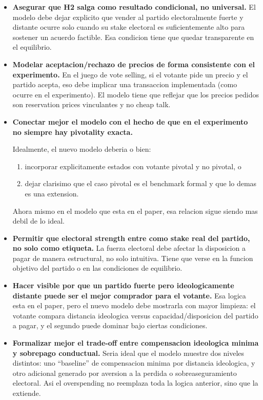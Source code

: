 \documentclass[11pt]{article}
\begin{document}
\begin{itemize}
\item \textbf{Asegurar que H2 salga como resultado condicional, no universal.}  
El modelo debe dejar explicito que vender al partido electoralmente fuerte y distante ocurre solo cuando su stake electoral es suficientemente alto para sostener un acuerdo factible. Esa condicion tiene que quedar transparente en el equilibrio.

\item \textbf{Modelar aceptacion/rechazo de precios de forma consistente con el experimento.}  
En el juego de vote selling, si el votante pide un precio y el partido acepta, eso debe implicar una transaccion implementada (como ocurre en el experimento). El modelo tiene que reflejar que los precios pedidos son reservation prices vinculantes y no cheap talk.

\item \textbf{Conectar mejor el modelo con el hecho de que en el experimento no siempre hay pivotality exacta.}  

Idealmente, el nuevo modelo deberia o bien:
\begin{enumerate}
\item incorporar explicitamente estados con votante pivotal y no pivotal, o
\item dejar clarisimo que el caso pivotal es el benchmark formal y que lo demas es una extension.
\end{enumerate}

Ahora mismo en el modelo que esta en el paper, esa relacion sigue siendo mas debil de lo ideal.

\item \textbf{Permitir que electoral strength entre como stake real del partido, no solo como etiqueta.}  
La fuerza electoral debe afectar la disposicion a pagar de manera estructural, no solo intuitiva. Tiene que verse en la funcion objetivo del partido o en las condiciones de equilibrio.

\item \textbf{Hacer visible por que un partido fuerte pero ideologicamente distante puede ser el mejor comprador para el votante.}  
Esa logica esta en el paper, pero el nuevo modelo debe mostrarla con mayor limpieza: el votante compara distancia ideologica versus capacidad/disposicion del partido a pagar, y el segundo puede dominar bajo ciertas condiciones.

\item \textbf{Formalizar mejor el trade-off entre compensacion ideologica minima y sobrepago conductual.}  
Seria ideal que el modelo muestre dos niveles distintos: uno ``baseline'' de compensacion minima por distancia ideologica, y otro adicional generado por aversion a la perdida o sobreaseguramiento electoral. Asi el overspending no reemplaza toda la logica anterior, sino que la extiende.


\end{itemize}
\end{document}
